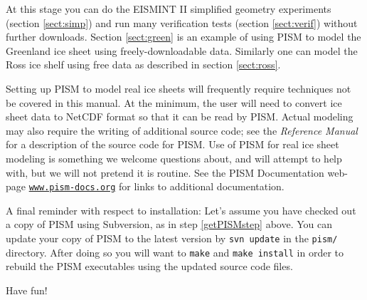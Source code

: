 \documentclass[11pt,final]{amsart}
\renewcommand{\t}[1]{\texttt{#1}}
\begin{document}
At this stage you can do the EISMINT II simplified geometry experiments (section \ref{sect:simp}) and run many verification tests (section \ref{sect:verif}) without further downloads.  Section \ref{sect:green} is an example of using PISM to model the Greenland ice sheet using freely-downloadable data.  Similarly one can model the Ross ice shelf using free data as described in section \ref{sect:ross}.

Setting up PISM to model real ice sheets will frequently require techniques not be covered in this manual.  At the minimum, the user will need to convert ice sheet data to NetCDF format so that it can be read by PISM.  Actual modeling may also require the writing of additional source code; see the \emph{Reference Manual} for a description of the source code for PISM.  Use of PISM for real ice sheet modeling is something we welcome questions about, and will attempt to help with, but we will not pretend it is routine.  See the PISM Documentation web-page \href{http://www.pism-docs.org/}{\t{www.pism-docs.org}} for links to additional documentation.

A final reminder with respect to installation:  Let's assume you have checked out a copy of PISM using Subversion, as in step \ref{getPISMstep} above.   You can update your copy of PISM to the latest version by \verb|svn update| in the \verb|pism/| directory.  After doing so you will want to \verb|make| and \verb|make install| in order to rebuild the PISM executables using the updated source code files.

Have fun!
\end{document}
